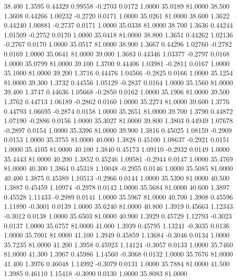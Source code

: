   38.400   1.3595   0.44329   0.99558  -0.2703   0.0172   1.0000  35.0189  81.0000
  38.500   1.3608   0.44266   1.00232  -0.2720   0.0171   1.0000  35.0261  81.0000
  38.600   1.3622   0.44240   1.00881  -0.2737   0.0171   1.0000  35.0338  81.0000
  38.700   1.3636   0.44244   1.01509  -0.2752   0.0170   1.0000  35.0418  81.0000
  38.800   1.3651   0.44262   1.02136  -0.2767   0.0170   1.0000  35.0517  81.0000
  38.900   1.3667   0.44296   1.02760  -0.2782   0.0169   1.0000  35.0641  81.0000
  39.000   1.3683   0.44346   1.03377  -0.2797   0.0168   1.0000  35.0799  81.0000
  39.100   1.3700   0.44406   1.03981  -0.2811   0.0167   1.0000  35.1000  81.0000
  39.200   1.3716   0.44476   1.04566  -0.2825   0.0166   1.0000  35.1254  81.0000
  39.300   1.3732   0.44556   1.05129  -0.2837   0.0164   1.0000  35.1560  81.0000
  39.400   1.3747   0.44636   1.05668  -0.2850   0.0162   1.0000  35.1906  81.0000
  39.500   1.3762   0.44713   1.06189  -0.2862   0.0160   1.0000  35.2274  81.0000
  39.600   1.3776   0.44793   1.06695  -0.2874   0.0158   1.0000  35.2651  81.0000
  39.700   1.3790   0.44872   1.07190  -0.2886   0.0156   1.0000  35.3027  81.0000
  39.800   1.3803   0.44949   1.07678  -0.2897   0.0154   1.0000  35.3396  81.0000
  39.900   1.3816   0.45025   1.08159  -0.2909   0.0153   1.0000  35.3755  81.0000
  40.000   1.3828   0.45100   1.08637  -0.2921   0.0151   1.0000  35.4105  81.0000
  40.100   1.3840   0.45173   1.09110  -0.2932   0.0149   1.0000  35.4443  81.0000
  40.200   1.3852   0.45246   1.09581  -0.2944   0.0147   1.0000  35.4769  81.0000
  40.300   1.3864   0.45318   1.10048  -0.2955   0.0146   1.0000  35.5085  81.0000
  40.400   1.3875   0.45389   1.10513  -0.2966   0.0144   1.0000  35.5390  81.0000
  40.500   1.3887   0.45459   1.10974  -0.2978   0.0142   1.0000  35.5684  81.0000
  40.600   1.3897   0.45528   1.11433  -0.2989   0.0141   1.0000  35.5967  81.0000
  40.700   1.3908   0.45596   1.11890  -0.3001   0.0139   1.0000  35.6240  81.0000
  40.800   1.3919   0.45663   1.12343  -0.3012   0.0138   1.0000  35.6503  81.0000
  40.900   1.3929   0.45729   1.12793  -0.3023   0.0137   1.0000  35.6757  81.0000
  41.000   1.3939   0.45795   1.13241  -0.3035   0.0136   1.0000  35.7001  81.0000
  41.100   1.3949   0.45859   1.13684  -0.3046   0.0134   1.0000  35.7235  81.0000
  41.200   1.3958   0.45923   1.14124  -0.3057   0.0133   1.0000  35.7460  81.0000
  41.300   1.3967   0.45986   1.14560  -0.3068   0.0132   1.0000  35.7676  81.0000
  41.400   1.3976   0.46048   1.14992  -0.3079   0.0131   1.0000  35.7884  81.0000
  41.500   1.3985   0.46110   1.15418  -0.3090   0.0130   1.0000  35.8083  81.0000

